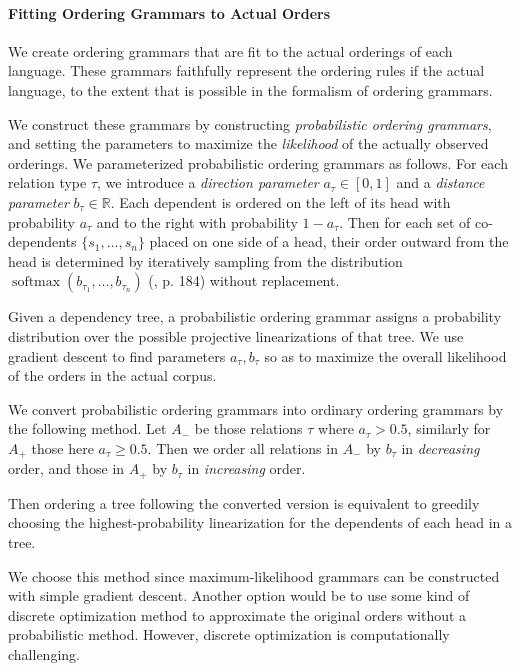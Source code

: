 \documentclass[11pt,letterpaper]{article}
\begin{document}
\paragraph{Fitting Ordering Grammars to Actual Orders}
We create ordering grammars that are fit to the actual orderings of each language.
These grammars faithfully represent the ordering rules if the actual language, to the extent that is possible in the formalism of ordering grammars.

We construct these grammars by constructing \emph{probabilistic ordering grammars}, and setting the parameters to maximize the \emph{likelihood} of the actually observed orderings.
We parameterized probabilistic ordering grammars as follows.
For each relation type $\tau$, we introduce a \emph{direction parameter} $a_\tau \in [0,1]$ and a \emph{distance parameter} $b_\tau \in \mathbb{R}$.
Each dependent is ordered on the left of its head with probability $a_\tau$ and to the right with probability $1-a_\tau$. 
Then for each set of co-dependents $\{s_1, \dots , s_n\}$ placed on one side of a head, their order outward from the head is determined by iteratively sampling from the distribution $\operatorname{softmax}(b_{\tau_1}, \dots, b_{\tau_n})$ (\cite{goodfellow2016deep}, p. 184) without replacement. 

Given a dependency tree, a probabilistic ordering grammar assigns a probability distribution over the possible projective linearizations of that tree.
We use gradient descent to find parameters $a_\tau, b_\tau$ so as to maximize the overall likelihood of the orders in the actual corpus.


We convert probabilistic ordering grammars into ordinary ordering grammars by the following method.
Let $A_-$ be those relations $\tau$ where $a_\tau > 0.5$, similarly for $A_+$ those here $a_\tau \geq 0.5$.
Then we order all relations in $A_-$ by $b_\tau$ in \emph{decreasing} order, and those in $A_+$ by $b_\tau$ in \emph{increasing} order.

Then ordering a tree following the converted version is equivalent to greedily choosing the highest-probability linearization for the dependents of each head in a tree.


We choose this method since maximum-likelihood grammars can be constructed with simple gradient descent.
Another option would be to use some kind of discrete optimization method to approximate the original orders without a probabilistic method.
However, discrete optimization is computationally challenging.
\end{document}
